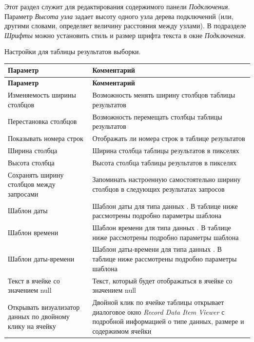 
Этот раздел служит для редактирования содержимого панели \textit{Подключения}.
Параметр \textit{Высота узла} задает высоту одного узла дерева подключений (или, другими словами, определяет величину расстояния между узлами). В подразделе \textit{Шрифты} можно установить стиль и размер шрифта текста в окне \textit{Подключения}.


Настройки для таблицы результатов выборки.
\hypertarget{tab:datapattern}{}
\begin{longtable}[r]{|>{\ttfamily}m{5cm}|m{10.5cm}|}
	\hline
	\centering\normalfont\bfseries Параметр &
	\centering\arraybslash\bfseries Комментарий\\\hline
	\endfirsthead
	\hline
	\centering\normalfont\bfseries Параметр &
	\centering\arraybslash\bfseries Комментарий\\\hline
	\endhead
	\hline
	Изменяемость ширины столбцов &  Возможность менять ширину столбцов таблицы результатов \\\hline
	Перестановка столбцов & Возможность перемещать столбцы таблицы результатов\\\hline
	Показывать номера строк & Отображать ли номера строк в таблице результатов\\\hline
	Ширина столбца & Ширина столбца таблицы результатов в пикселях\\\hline
	Высота столбца &  Высота столбца таблицы результатов в пикселях\\\hline
	Сохранять ширину столбцов между запросами & Запоминать настроенную самостоятельно ширину столбцов в следующих результатах запросов \\\hline
	Шаблон даты & Шаблон даты для типа данных \ttt{DATE}. В таблице ниже рассмотрены подробно параметры шаблона\\\hline
	Шаблон времени & Шаблон времени для типа данных \ttt{TIME}. В таблице ниже рассмотрены подробно параметры шаблона\\\hline
	Шаблон даты-времени & Шаблон даты-времени для типа данных \ttt{TIMESTAMP}. В таблице ниже рассмотрены подробно параметры шаблона\\\hline
	Текст в ячейке со значением null & Текст, который будет отображаться в ячейке со значением null\\\hline
	Открывать визуализатор данных по двойному клику на ячейку & Двойной клик по ячейке таблицы открывает диалоговое окно \textit{Record Data Item Viewer} с подробной информацией о типе данных, размере и содержимом ячейки \\\hline

\end{longtable}
